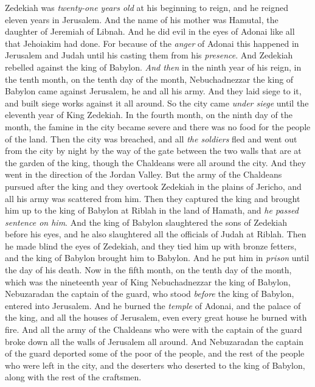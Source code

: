\begin{biblechapter} %
 Zedekiah was \textit{twenty-one years old} at his beginning to reign, and he reigned eleven years in Jerusalem. And the name of his mother was Hamutal, the daughter of Jeremiah of Libnah.
\verse And he did evil in the eyes of Adonai like all that Jehoiakim had done.
\verse For because of the \textit{anger} of Adonai this happened in Jerusalem and Judah until his casting them from his \textit{presence}. And Zedekiah rebelled against the king of Babylon.
\verse \textit{And then} in the ninth year of his reign, in the tenth month, on the tenth day of the month, Nebuchadnezzar the king of Babylon came against Jerusalem, he and all his army. And they laid siege to it, and built siege works against it all around.
\verse So the city came \textit{under siege} until the eleventh year of King Zedekiah.
\verse In the fourth month, on the ninth day of the month, the famine in the city became severe and there was no food for the people of the land.
\verse Then the city was breached, and all \textit{the soldiers} fled and went out from the city by night by the way of the gate between the two walls that are at the garden of the king, though the Chaldeans were all around the city. And they went in the direction of the Jordan Valley.
\verse But the army of the Chaldeans pursued after the king and they overtook Zedekiah in the plains of Jericho, and all his army was scattered from him.
\verse Then they captured the king and brought him up to the king of Babylon at Riblah in the land of Hamath, and \textit{he passed sentence on him}.
\verse And the king of Babylon slaughtered the sons of Zedekiah before his eyes, and he also slaughtered all the officials of Judah at Riblah.
\verse Then he made blind the eyes of Zedekiah, and they tied him up with bronze fetters, and the king of Babylon brought him to Babylon. And he put him in \textit{prison} until the day of his death.
\verse Now in the fifth month, on the tenth day of the month, which was the nineteenth year of King Nebuchadnezzar the king of Babylon, Nebuzaradan the captain of the guard, who stood \textit{before} the king of Babylon, entered into Jerusalem.
\verse And he burned the \textit{temple} of Adonai, and the palace of the king, and all the houses of Jerusalem, even every great house he burned with fire.
\verse And all the army of the Chaldeans who were with the captain of the guard broke down all the walls of Jerusalem all around.
\verse And Nebuzaradan the captain of the guard deported some of the poor of the people, and the rest of the people who were left in the city, and the deserters who deserted to the king of Babylon, along with the rest of the craftsmen.

\end{biblechapter}
